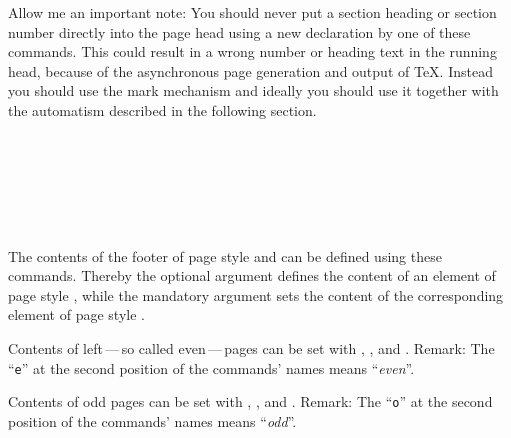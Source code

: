 Allow me an important note: You should never put a
section heading or section number directly into the page head using a new
declaration by one of these commands. This could result in a wrong number or
heading text in the running head, because of the asynchronous page generation
and output of \TeX. Instead you should use the mark mechanism and ideally you
should use it together with the automatism described in the following
section.%
%
%
%
%
%
%

\begin{Declaration}
                \\
                \\
                \\
                \\
                \\
\end{Declaration}
%
%
%
%
%
%
The contents of the footer of page style  and
 can be defined using these commands. Thereby the
optional argument defines the content of an element of page style
, while the mandatory argument sets the content
of the corresponding element of page style .

Contents of left\,---\,so called even\,---\,pages can be set with
, , and . Remark: The ``\texttt{e}''
at the second position of the commands' names means ``\emph{even}''.

Contents of odd pages can be set with , , and
. Remark: The ``\texttt{o}'' at the second position of the
commands' names means ``\emph{odd}''.

